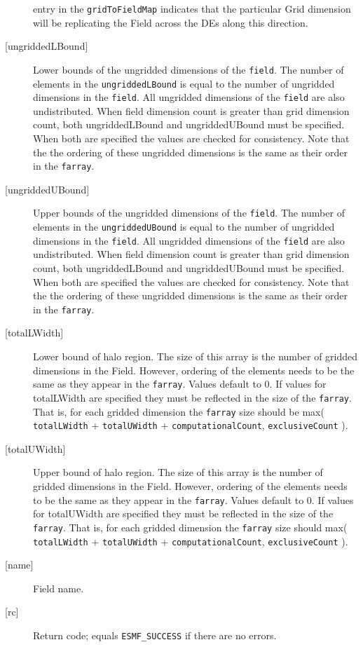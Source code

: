 \begin{description}
   entry in the {\tt gridToFieldMap} indicates that the particular 
   Grid dimension will be replicating the Field across the DEs along 
   this direction. 
   \item [{[ungriddedLBound]}] 
   Lower bounds of the ungridded dimensions of the {\tt field}. 
   The number of elements in the {\tt ungriddedLBound} is equal to the number of ungridded 
   dimensions in the {\tt field}. All ungridded dimensions of the 
   {\tt field} are also undistributed. When field dimension count is 
   greater than grid dimension count, both ungriddedLBound and ungriddedUBound 
   must be specified. When both are specified the values are checked 
   for consistency. Note that the the ordering of 
   these ungridded dimensions is the same as their order in the {\tt farray}. 
   \item [{[ungriddedUBound]}] 
   Upper bounds of the ungridded dimensions of the {\tt field}. 
   The number of elements in the {\tt ungriddedUBound} is equal to the number of ungridded 
   dimensions in the {\tt field}. All ungridded dimensions of the 
   {\tt field} are also undistributed. When field dimension count is 
   greater than grid dimension count, both ungriddedLBound and ungriddedUBound 
   must be specified. When both are specified the values are checked 
   for consistency. Note that the the ordering of 
   these ungridded dimensions is the same as their order in the {\tt farray}. 
   \item [{[totalLWidth]}] 
   Lower bound of halo region. The size of this array is the number 
   of gridded dimensions in the Field. However, ordering of the elements 
   needs to be the same as they appear in the {\tt farray}. Values default 
   to 0. If values for totalLWidth are specified they must be reflected in 
   the size of the {\tt farray}. That is, for each gridded dimension the 
   {\tt farray} size should be max( {\tt totalLWidth} + {\tt totalUWidth} 
   + {\tt computationalCount}, {\tt exclusiveCount} ). 
   \item [{[totalUWidth]}] 
   Upper bound of halo region. The size of this array is the number 
   of gridded dimensions in the Field. However, ordering of the elements 
   needs to be the same as they appear in the {\tt farray}. Values default 
   to 0. If values for totalUWidth are specified they must be reflected in 
   the size of the {\tt farray}. That is, for each gridded dimension the 
   {\tt farray} size should max( {\tt totalLWidth} + {\tt totalUWidth} 
   + {\tt computationalCount}, {\tt exclusiveCount} ). 
   \item [{[name]}] 
   Field name. 
   \item [{[rc]}] 
   Return code; equals {\tt ESMF\_SUCCESS} if there are no errors. 
   \end{description} 
    
